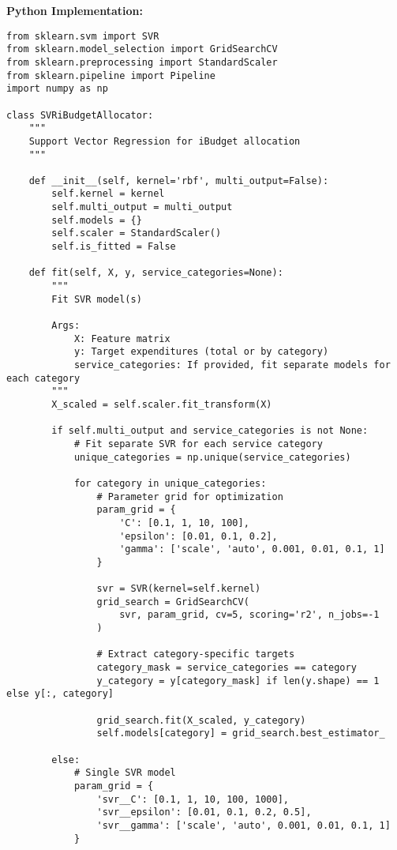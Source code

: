 \documentclass[12pt]{article}
\begin{document}
\textbf{Python Implementation:}
\begin{lstlisting}
from sklearn.svm import SVR
from sklearn.model_selection import GridSearchCV
from sklearn.preprocessing import StandardScaler
from sklearn.pipeline import Pipeline
import numpy as np

class SVRiBudgetAllocator:
    """
    Support Vector Regression for iBudget allocation
    """
    
    def __init__(self, kernel='rbf', multi_output=False):
        self.kernel = kernel
        self.multi_output = multi_output
        self.models = {}
        self.scaler = StandardScaler()
        self.is_fitted = False
        
    def fit(self, X, y, service_categories=None):
        """
        Fit SVR model(s)
        
        Args:
            X: Feature matrix
            y: Target expenditures (total or by category)
            service_categories: If provided, fit separate models for each category
        """
        X_scaled = self.scaler.fit_transform(X)
        
        if self.multi_output and service_categories is not None:
            # Fit separate SVR for each service category
            unique_categories = np.unique(service_categories)
            
            for category in unique_categories:
                # Parameter grid for optimization
                param_grid = {
                    'C': [0.1, 1, 10, 100],
                    'epsilon': [0.01, 0.1, 0.2],
                    'gamma': ['scale', 'auto', 0.001, 0.01, 0.1, 1]
                }
                
                svr = SVR(kernel=self.kernel)
                grid_search = GridSearchCV(
                    svr, param_grid, cv=5, scoring='r2', n_jobs=-1
                )
                
                # Extract category-specific targets
                category_mask = service_categories == category
                y_category = y[category_mask] if len(y.shape) == 1 else y[:, category]
                
                grid_search.fit(X_scaled, y_category)
                self.models[category] = grid_search.best_estimator_
        
        else:
            # Single SVR model
            param_grid = {
                'svr__C': [0.1, 1, 10, 100, 1000],
                'svr__epsilon': [0.01, 0.1, 0.2, 0.5],
                'svr__gamma': ['scale', 'auto', 0.001, 0.01, 0.1, 1]
            }
            

\end{lstlisting}
\end{document}
